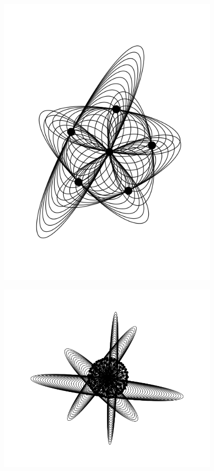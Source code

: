 \documentclass[11pt]{article}
\begin{document}
\begin{figure}[htp]
\centering
\includegraphics[scale=0.60]{img/science_fiction_directories.png}
\caption{}
\label{}
\end{figure}



\begin{figure}[htp]
\centering
\includegraphics[scale=0.6]{1363498617__knowledge-reactor.png}
\caption{}
\label{}
\end{figure}
\end{document}
